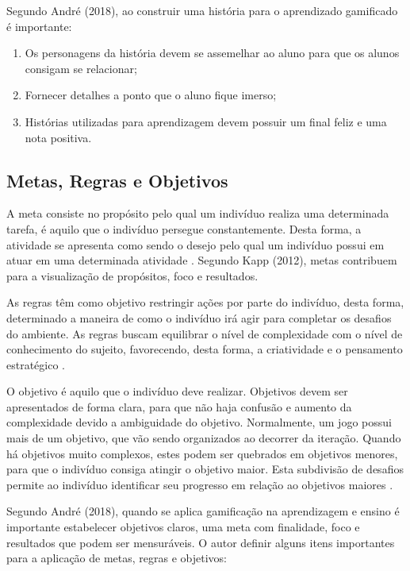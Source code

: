 \documentclass[
	12pt,				%
	oneside,			%
	a4paper,			%
	english,			%
	french,				%
	spanish,			%
	brazil,				%
	]{abntex2}
\begin{document}
Segundo André (2018), ao construir uma história para o aprendizado gamificado é importante:
\begin{enumerate}
\item Os personagens da história devem se assemelhar ao aluno para que os alunos consigam se relacionar;
\item Fornecer detalhes a ponto que o aluno fique imerso;
\item Histórias utilizadas para aprendizagem devem possuir um final feliz e uma nota positiva.
\end{enumerate}

\subsection{Metas, Regras e Objetivos}

A meta consiste no propósito pelo qual um indivíduo realiza uma determinada tarefa, é aquilo que o indivíduo persegue constantemente. Desta forma, a atividade se apresenta como sendo o desejo pelo qual um indivíduo possui em atuar em uma determinada atividade \cite{bunchball2016gamification}. Segundo Kapp (2012), metas contribuem para a visualização de propósitos, foco e resultados.

As regras têm como objetivo restringir ações por parte do indivíduo, desta forma, determinado a maneira de como o indivíduo irá agir para completar os desafios do ambiente. As regras buscam equilibrar o nível de complexidade com o nível de conhecimento do sujeito, favorecendo, desta forma, a criatividade e o pensamento estratégico \cite{bunchball2016gamification}.

O objetivo é aquilo que o indivíduo deve realizar. Objetivos devem ser apresentados de forma clara, para que não haja confusão e aumento da complexidade devido a ambiguidade do objetivo. Normalmente, um jogo possui mais de um objetivo, que vão sendo organizados ao decorrer da iteração. Quando há objetivos muito complexos, estes podem ser quebrados em objetivos menores, para que o indivíduo consiga atingir o objetivo maior. Esta subdivisão de desafios permite ao indivíduo identificar seu progresso em relação ao objetivos maiores \cite{fardo2013gamificaccao}.

Segundo André (2018), quando se aplica gamificação na aprendizagem e ensino é importante estabelecer objetivos claros, uma meta com finalidade, foco e resultados que podem ser mensuráveis. O autor definir alguns itens importantes para a aplicação de metas, regras e objetivos:
\end{document}
